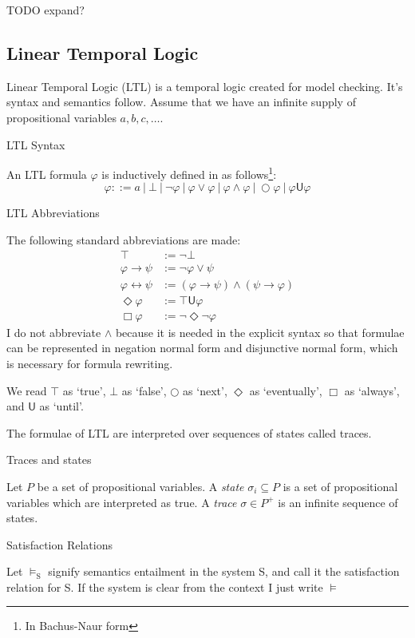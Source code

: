 \documentclass[a4paper]{article}
\newcommand{\U}{\mathsf{U}}
\begin{document}
TODO expand?

\subsection{Linear Temporal Logic}
Linear Temporal Logic (LTL)\autocite{pnueli1977temporal} is a temporal logic created for model checking. It's syntax and semantics follow. Assume that we have an infinite supply of propositional variables $a,b,c,\dots$.
\begin{defn}{LTL Syntax}

  An LTL formula $\varphi$ is inductively defined in as follows\footnote{In Bachus-Naur form}:
  \[\varphi ::= a ~|~ \bot ~|~ \neg \varphi ~|~\varphi \lor \varphi ~|~ \varphi \land \varphi ~|~ \bigcirc \varphi ~|~ \varphi \U\varphi\]
\end{defn}
\begin{notn}{LTL Abbreviations}\label{ltlabbrev}

  The following standard abbreviations are made:
  \begin{align*}
    \top &:= \neg \bot\\
    \varphi \to \psi &:= \neg \varphi \lor \psi\\
    \varphi \leftrightarrow \psi &:= (\varphi \to \psi) \land (\psi \to \varphi)\\
    \Diamond \varphi &:= \top \U{} \varphi\\
    \Box \varphi &:= \neg\Diamond\neg\varphi
  \end{align*}
  I do not abbreviate $\land$ because it is needed in the explicit syntax so that formulae can be represented in negation normal form and disjunctive normal form, which is necessary for formula rewriting.
\end{notn}

We read $\top$ as `true', $\bot$ as `false', $\bigcirc$ as `next', $\Diamond$ as `eventually', $\Box$ as `always', and $\U$ as `until'.

The formulae of LTL are interpreted over sequences of states called traces.

\begin{defn}{Traces and states}

  Let $P$ be a set of propositional variables. A \emph{state} $\sigma_i \subseteq P$ is a set of propositional variables which are interpreted as true. A \emph{trace} $\sigma \in P^+$ is an infinite sequence of states.
\end{defn}

\begin{notn}{Satisfaction Relations}

  Let $\vDash_{\text{S}}$ signify semantics entailment in the system S, and call it the satisfaction relation for S. If the system is clear from the context I just write $\vDash$

\end{notn}
\end{document}
